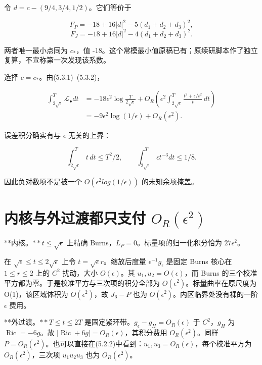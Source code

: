 \documentclass[UTF8,11pt,openany,fontset=none]{ctexbook}
\theoremstyle{definition}
\theoremstyle{remark}
\begin{document}
令 \(d=c-(9/4,3/4,1/2)\)。它们等价于

\[
F_P=-18+16|d|^2-5(d_1+d_2+d_3)^2,
\] \[
F_J=-18+16|d|^2-4(d_1+d_2+d_3)^2.
\]

两者唯一最小点同为 \(c_*\)，值 -18。这个常模最小值原稿已有；原续研脚本作了独立复算，不宣称第一次发现该系数。

选择 \(c=c_*\)。由(5.3.1)--(5.3.2)，

\[
\begin{aligned}
\int_{2\sqrt\epsilon}^{T}\mathscr L_\bullet dt
&=-18\epsilon^2\log\frac{T}{2\sqrt\epsilon}
 +O_R\left(\epsilon^2\int_{2\sqrt\epsilon}^{T}
 \frac{t^2+\epsilon/t^2}{t}\,dt\right)\\
&=-9\epsilon^2\log(1/\epsilon)+O_R(\epsilon^2).
\end{aligned}
\]

误差积分确实有与 \(\epsilon\) 无关的上界：

\[
\int_{2\sqrt\epsilon}^{T}t\,dt\le T^2/2,\qquad
\int_{2\sqrt\epsilon}^{T}\epsilon t^{-3}dt\le1/8.
\]

因此负对数项不是被一个 \(O(\epsilon ^2log(1/\epsilon ))\) 的未知余项掩盖。

\section{\texorpdfstring{内核与外过渡都只支付 \(O_R(\epsilon ^2)\)}{内核与外过渡都只支付 O\_R(\textbackslash epsilon \^{}2)}}\label{v5-ux5185ux6838ux4e0eux5916ux8fc7ux6e21ux90fdux53eaux652fux4ed8-o_repsilon-2}

**内核。\(** t\le \sqrt{\epsilon }\) 上精确 Burns，\(L_P=0\)。标量项的归一化积分恰为 \(27\epsilon ^2\)。

在 \(\sqrt{\epsilon }\le t\le 2\sqrt{\epsilon }\) 上令 \(t=\sqrt{\epsilon  }r\)。缩放后度量 \(\epsilon ^{-1}g_\epsilon\) 是固定 Burns 核心在 \(1\le r\le 2\) 上的 \(C^2\) 扰动，大小 \(O(\epsilon )\)。其 \(u_1,u_2=O(\epsilon )\)，而 Burns 的三个校准平方都为零。于是校准平方与三次项的积分全部为 \(O(\epsilon ^2)\)。标量曲率在原尺度为 O(1)，该区域体积为 \(O(\epsilon ^2)\)，故 \(J_6-P\) 也为 \(O(\epsilon ^2)\)。内区临界处没有裸的一阶 \(\epsilon\) 费用。

**外过渡。\(** T\le t\le 2T\) 是固定紧环带。\(g_\epsilon -g_H=O_R(\epsilon )\) 于 \(C^2\)，\(g_H\) 为 \(\operatorname{Ric}=-6g\)。故 \(|\operatorname{Ric}+6g|=O_R(\epsilon )\)，其积分费用 \(O_R(\epsilon ^2)\)。同样 \(P=O_R(\epsilon ^2)\)。也可以直接在(5.2.2)中看到：\(u_1,u_3=O_R(\epsilon )\)，每个校准平方为 \(O_R(\epsilon ^2)\)，三次项 \(u_1u_2u_3\) 也为 \(O_R(\epsilon ^2)\)。
\end{document}
